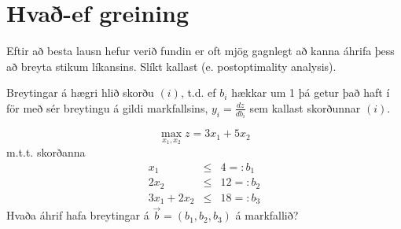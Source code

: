\section{Hvað-ef greining}
Eftir að besta lausn hefur verið fundin er oft mjög gagnlegt að kanna áhrifa þess að breyta stikum líkansins. Slíkt kallast  (e. post\-optimality analysis).

Breytingar á hægri hlið skorðu $(i)$, t.d. ef $b_i$ hækkar um 1 þá getur það haft í för með sér breytingu á gildi markfallsins, $y_i=\frac{dz}{db_i}$ sem kallast  skorðunnar $(i)$.

\begin{daemi}\label{wyndor:postoptimality}
$$\max_{x_1,x_2} z=3x_1+5x_2 $$
m.t.t. skorðanna
\begin{eqnarray}
 x_1 & \leq & 4 =: b_1 \label{postoptimality:1} \\ 
 2x_2 & \leq &12 =: b_2 \label{postoptimality:2} \\
 3x_1 + 2x_2&\leq&18 =: b_3 \label{postoptimality:3}
\end{eqnarray}
Hvaða áhrif hafa breytingar á $\vec{b}=(b_1,b_2,b_3)$ á markfallið?
\end{daemi}
